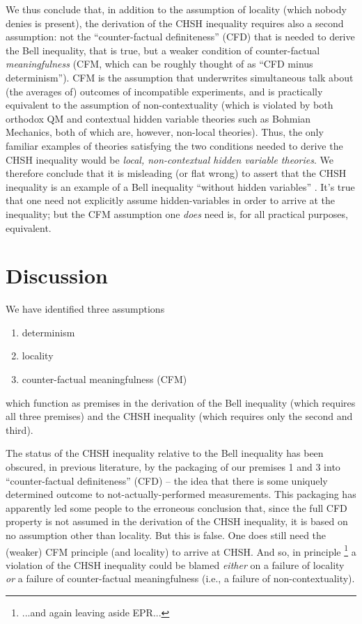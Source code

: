 \documentclass[aps,prc,onecolumn,12pt,nofootinbib]{revtex4-2}
\begin{document}
We thus conclude that, in addition to the assumption of locality
(which nobody denies is present), the derivation of the CHSH inequality
requires also a second assumption:  not the ``counter-factual
definiteness'' (CFD) that is needed to derive the Bell inequality, that is
true, but a weaker condition of counter-factual \emph{meaningfulness}
(CFM, which can be roughly thought of as ``CFD minus determinism'').
CFM is the assumption that underwrites simultaneous talk about (the
averages of) outcomes of incompatible experiments, and is practically
equivalent to the assumption of non-contextuality (which is violated
by both orthodox QM and contextual hidden variable theories such
as Bohmian Mechanics, both of which are, however, non-local theories).
Thus, the only familiar examples of theories satisfying the two
conditions needed to derive the CHSH inequality would be \emph{local,
non-contextual hidden variable theories}.  We therefore conclude that
it is misleading (or flat wrong) to assert that the CHSH inequality is
an example of a Bell inequality ``without hidden
variables'' \cite{eberhard}.   It's true that one need not explicitly assume
hidden-variables in order to arrive at the inequality; but the CFM
assumption one \emph{does} need is, for all practical purposes,
equivalent.



\section{Discussion}

We have identified three assumptions
\begin{enumerate}
\item determinism
\item locality
\item counter-factual meaningfulness (CFM)
\end{enumerate}
which function as premises in the derivation of the Bell inequality
(which requires all three premises) and the CHSH inequality (which
requires only the second and third).

The status of the CHSH inequality relative to the Bell inequality has
been obscured, in previous literature, by the packaging of our
premises 1 and 3 into ``counter-factual definiteness'' (CFD) -- the
idea that there is some uniquely determined outcome to
not-actually-performed measurements.  This packaging has apparently
led some people to the erroneous conclusion that, since the full CFD
property is not assumed in the derivation of the CHSH inequality, it
is based on no assumption other than locality.  But this is false.
One does still need the (weaker) CFM principle (and locality) to
arrive at CHSH.  And so, in principle \footnote{...and again leaving
  aside EPR...} a violation of the CHSH inequality could be blamed
\emph{either} on a failure of locality \emph{or} a failure of
counter-factual meaningfulness (i.e., a failure of non-contextuality).
\end{document}
